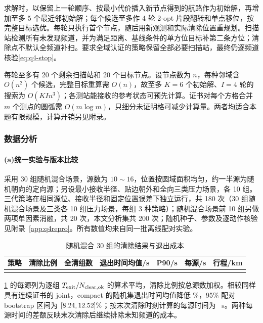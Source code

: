 求解时，以保留上一轮顺序、按最小代价插入新节点得到的航路作为初始解，再增加至多 5 个最近邻初始解；每个候选至多作 4 轮 2-opt 片段翻转和单点移位\cite{croes1958}，按完整目标选优。每轮只执行首个节点，随后用新观测和实际清除位置重规划。扫描站检测所有未发现频道，并为满足距离、基线条件的单方位目标补第二条方位；清除点不默认全频道补扫。要求全域认证的策略保留全部必要扫描站，最终仍逐频道核验\cref{eq:q4-stop}。

每轮至多有 20 个剩余扫描站和 20 个目标节点。设节点数为 $n$，每种邻域含 $O(n^2)$ 个候选，完整目标重算需 $O(n)$，故至多 $K=6$ 个初始解、$I=4$ 轮的搜索为 $O(KIn^3)$；各测站能接收的参考状态可预先计算。证书对每个方格合并 $m$ 个测点的圆弧需 $O(m\log m)$，只细分未证明格可减少计算量。两者均适合本题有限规模，计算开销另见附录。

\subsubsection{数据分析}
\paragraph{\textbf{(a)}\hspace{0.2em}统一实验与版本比较}
采用 30 组随机混合场景，源数为 $10\sim16$，位置按圆域面积均匀，约一半源为随机朝向的定向源；另设最小接收半径、贴边朝外和全向三类压力场景，各 10 组。三代策略在相同源位、接收半径和固定位置误差下独立运行，共 180 次（30 组随机混合场景及三类各 10 组压力场景，每组 3 种策略）；随机混合场景前 10 组另做两项单因素消融，共 20 次，本文分析集共 200 次；随机种子、参数及逐动作核验见附录~\ref{app:q4repro}。所有数值均来自同一批离线配对实验。

\begin{table}[!htbp]\centering
\caption{随机混合 30 组的清除结果与退出成本}\label{tab:q4-main}
\begin{tabular}{@{}lrrrrrr@{}}\toprule
策略 & 清除比例 & 全清组数 & 退出时间均值/s & P90/s & 每源/s & 行程/km\\\midrule
\\
\bottomrule\end{tabular}\end{table}
\cref{tab:q4-main} 的每源列为逐组 $T_{\rm exit}/N_{\rm clear,ok}$ 的算术平均，清除比例按总源数加权。相较同样具有连续证书的 \textrm{joint}，\textrm{compact} 的随机集退出时间均值降低 \QFourSaving\%，95\% 配对 bootstrap\cite{efron1993} 区间为 $[8.24,12.52]\%$；按末次清除时刻计算的每源时间为 \QFourLastPerSource\ s。两种每源时间的差额反映末次清除后继续排除未知频道的成本。

